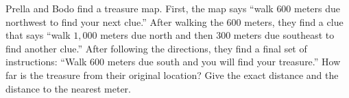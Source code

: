 Prella and Bodo find a treasure map. First, the map says ``walk $600$ meters due northwest to find your next clue.'' After walking the $600$ meters, they find a clue that says ``walk $1{,}000$ meters due north and then $300$ meters due southeast to find another clue.'' After following the directions, they find a final set of instructions: ``Walk $600$ meters due south and you will find your treasure.'' How far is the treasure from their original location? Give the exact distance and the distance to the nearest meter.
